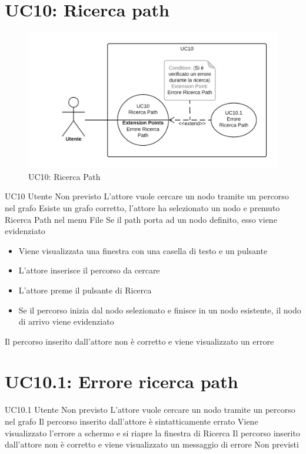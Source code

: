 \documentclass[../AnalisideiRequisiti.tex]{subfiles}
\begin{document}
\section{UC10: Ricerca path}
\begin{figure}[H]
	\centering
	\includegraphics[width=\textwidth]{../img/UC10.png}
	\caption{UC10: Ricerca Path}
\end{figure}
\UserCase
{UC10}
{Utente}
{Non previsto}
{L'attore vuole cercare un nodo tramite un percorso nel grafo}
{Esiste un grafo corretto, l'attore ha selezionato un nodo e premuto Ricerca Path nel menu File}
{Se il path porta ad un nodo definito, esso viene evidenziato }
{
	\begin{itemize}
		\item{} Viene visualizzata una finestra con una casella di testo e un pulsante
		\item{} L'attore inserisce il percorso da cercare
		\item{} L'attore preme il pulsante di Ricerca
		\item{} Se il percorso inizia dal nodo selezionato e finisce in un nodo esistente, il nodo di arrivo viene evidenziato 
 	\end{itemize}
}
{Il percorso inserito dall'attore non è corretto e viene visualizzato un errore }

\section{UC10.1: Errore ricerca path}
\UserCase
{UC10.1}
{Utente}
{Non previsto}
{L'attore vuole cercare un nodo tramite un percorso nel grafo}
{Il percorso inserito dall'attore è sintatticamente errato}
{Viene visualizzato l'errore a schermo e si riapre la finestra di Ricerca }
{Il percorso inserito dall'attore non è corretto e viene visualizzato un messaggio di errore}
{Non previsti}
\end{document}
